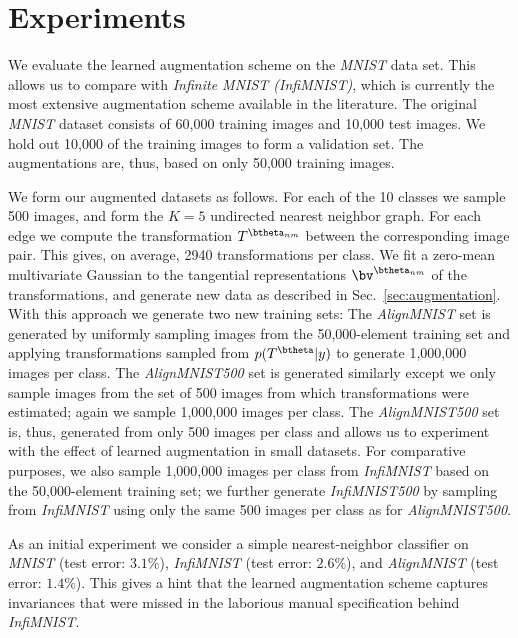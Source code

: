 \documentclass[twoside]{article}
\begin{document}
  \section{Experiments}
  We evaluate the learned augmentation scheme on the \emph{MNIST} data set. This allows
  us to compare with \emph{Infinite MNIST (InfiMNIST)}\cite{loosli:lskm:2007},
  which is currently the most extensive augmentation scheme available in the
  literature. The original \emph{MNIST} dataset consists of 60,000 training images and
  10,000 test images. We hold out 10,000 of the training images to form a validation
  set. The augmentations are, thus, based on only 50,000 training images.
  
  We form our augmented datasets as follows. For each of the 10 classes we sample
  500 images, and form the $K=5$ undirected nearest neighbor graph. For each edge
  we compute the transformation $T^{\btheta_{nm}}$ between the corresponding
  image pair. This gives, on average, 2940 transformations per class. We fit %
  a zero-mean multivariate Gaussian to the tangential
  representations $\bv^{\btheta_{nm}}$ of the transformations, and generate new
  data as described in Sec.~\ref{sec:augmentation}. With this approach we generate two new training
  sets: The \emph{AlignMNIST} set is generated by uniformly sampling images from
  the 50,000-element training set and applying transformations sampled from $p(T^\btheta | y)$
  to generate 1,000,000 images per class. The \emph{AlignMNIST500} set is generated
  similarly except we only sample images from the set of 500 images from which
  transformations were estimated; again we sample 1,000,000 images per class.
  The \emph{AlignMNIST500} set is, thus, generated from only 500 images per class and
  allows us to experiment with the effect of learned augmentation in small datasets.
  For comparative purposes, we also sample 1,000,000 images per class from
  \emph{InfiMNIST} based on the 50,000-element training set; we further generate
  \emph{InfiMNIST500} by sampling from \emph{InfiMNIST} using only the same 500 images
  per class as for \emph{AlignMNIST500}. 
  
  As an initial experiment we consider a simple nearest-neighbor classifier on
  \emph{MNIST} (test error: $3.1\%$), \emph{InfiMNIST} (test error: $2.6\%$),
  and \emph{AlignMNIST} (test error: $1.4\%$). This gives a hint that the learned
  augmentation scheme captures invariances 
  that were missed
  in the laborious
  manual specification behind \emph{InfiMNIST}.
  
\end{document}
